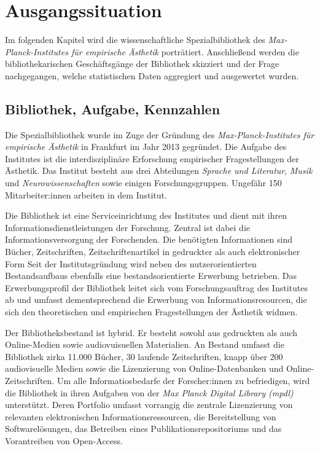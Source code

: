 \chapter{Ausgangssituation}

Im folgenden Kapitel wird die wissenschaftliche Spezialbibliothek des \textit{Max-Planck-Institutes für empirische Ästhetik} porträtiert. 
Anschließend werden die bibliothekarischen Geschäftsgänge der
Bibliothek skizziert und der Frage nachgegangen, welche statistischen Daten aggregiert und ausgewertet wurden. 

\section{Bibliothek, Aufgabe, Kennzahlen}


Die Spezialbibliothek wurde im Zuge der Gründung des \textit{Max-Planck-Institutes für empirische Ästhetik} in Frankfurt im Jahr 2013 gegründet.
Die Aufgabe des Institutes ist die interdisziplinäre Erforschung empirischer Fragestellungen der Ästhetik. Das Institut besteht aus drei Abteilungen 
\textit{Sprache und Literatur}, \textit{Musik} und \textit{Neurowissenschaften} sowie einigen Forschungsgruppen. Ungefähr 150 Mitarbeiter:innen arbeiten 
in dem Institut. 

Die Bibliothek ist eine Serviceinrichtung des Institutes und dient mit ihren Informationsdienstleistungen der Forschung.
Zentral ist dabei die Informationsversorgung der Forschenden.
Die benötigten Informationen sind Bücher, Zeitschriften, Zeitschriftenartikel in gedruckter als auch elektronischer Form
Seit der Institutsgründung wird neben des nutzerorientierten Bestandsaufbaus ebenfalls eine bestandsorientierte Erwerbung betrieben.
Das Erwerbungsprofil der Bibliothek leitet sich vom Forschungsauftrag des Institutes ab und umfasst dementsprechend die Erwerbung von Informationsresourcen, die sich den theoretischen und empirischen Fragestellungen der Ästhetik widmen.

Der Bibliotheksbestand ist hybrid. Er besteht sowohl aus gedruckten als auch Online-Medien sowie audiovuisuellen Materialien.
An Bestand umfasst die Bibliothek zirka 11.000 Bücher, 30 laufende Zeitschriften, knapp über 200 audiovisuelle Medien sowie die Lizenzierung von Online-Datenbanken
und Online-Zeitschriften.
Um alle Informatiosbedarfe der Forscher:innen zu befriedigen, wird die Bibliothek in ihren Aufgaben von der
\textit{Max Planck Digital Library ({mpdl})} unterstützt. Deren Portfolio umfasst vorrangig die zentrale Lizenzierung
von relevanten elektronischen Informationsressourcen, die Bereitstellung
von Softwarelösungen, das Betreiben eines Publikationsrepositoriums und
das Vorantreiben von Open-Access. 

